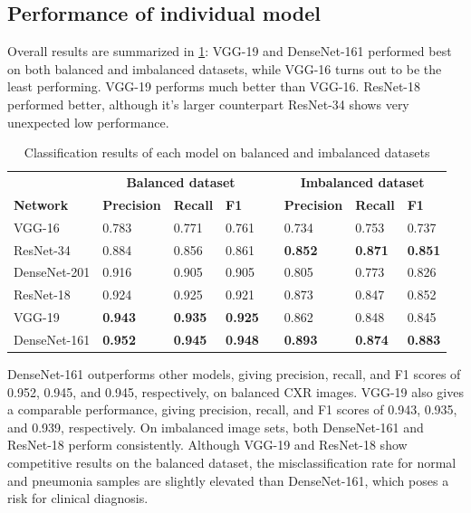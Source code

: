 \documentclass[conference]{IEEEtran}
\begin{document}
\subsection{Performance of individual model}
Overall results are summarized in \cref{Table:all_models}: VGG-19 and DenseNet-161 performed best on both balanced and imbalanced datasets, while VGG-16 turns out to be the least performing. VGG-19 performs much better than VGG-16. %
ResNet-18 performed better, although it's larger counterpart ResNet-34 shows very unexpected low performance. %
\begin{table}
    \centering
	\caption{Classification results of each model on balanced and imbalanced datasets} 
	\label{Table:all_models}
	\scriptsize{
	\begin{tabular}{p{2.9cm}p{1.6cm}p{1.4cm}p{1.0cm}p{0.3cm}p{1.5cm}p{1.4cm}p{1.0cm}}
	 & \multicolumn{3}{c}{\bfseries{Balanced dataset}} && \multicolumn{3}{c}{\bfseries{Imbalanced dataset}} \\
		\cmidrule{2-4}\cmidrule{6-8}   
        \textbf{Network}& \textbf{Precision} & \textbf{Recall}& \textbf{F1} && \textbf{Precision} & \textbf{Recall}& \textbf{F1}\\
		\hline
		VGG-16 & 0.783 & 0.771 & 0.761 && 0.734 & 0.753 & 0.737\\
		ResNet-34 & 0.884 & 0.856 & 0.861 && \textbf{0.852} & \textbf{0.871} & \textbf{0.851} \\
		DenseNet-201  & 0.916 & 0.905 & 0.905 && 0.805 & 0.773 & 0.826\\		
		ResNet-18 & 0.924 & 0.925 & 0.921 && 0.873 & 0.847 & 0.852\\
		VGG-19 & \textbf{0.943} & \textbf{0.935} & \textbf{0.925} && 0.862 & 0.848 & 0.845\\
		DenseNet-161  & \textbf{0.952} & \textbf{0.945} & \textbf{0.948} && \textbf{0.893} & \textbf{0.874} & \textbf{0.883}\\
		\hline
	\end{tabular}}
\end{table}
DenseNet-161 outperforms other models, giving precision, recall, and F1 scores of 0.952, 0.945, and 0.945, respectively, on balanced CXR images. VGG-19 also gives a comparable performance, giving precision, recall, and F1 scores of 0.943, 0.935, and 0.939, respectively. On imbalanced image sets, both DenseNet-161 and ResNet-18 perform consistently. Although VGG-19 and ResNet-18 show competitive results on the balanced dataset, the misclassification rate for normal and pneumonia samples are slightly elevated than DenseNet-161, which poses a risk for clinical diagnosis. 
\end{document}
